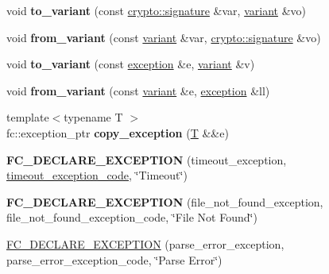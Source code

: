 \begin{DoxyCompactItemize}
\mbox{\label{namespacefc_aa5e2b21d0072d16a3f54eb1074606bb2}} 
void {\bfseries to\+\_\+variant} (const \mbox{\hyperlink{classfc_1_1crypto_1_1signature}{crypto\+::signature}} \&var, \mbox{\hyperlink{classfc_1_1variant}{variant}} \&vo)
\item 
\mbox{\label{namespacefc_a5df83b6ab6fb04781a438ac3ad62970b}} 
void {\bfseries from\+\_\+variant} (const \mbox{\hyperlink{classfc_1_1variant}{variant}} \&var, \mbox{\hyperlink{classfc_1_1crypto_1_1signature}{crypto\+::signature}} \&vo)
\item 
\mbox{\label{namespacefc_a884f9614b8437dc47cb85485135768d9}} 
void {\bfseries to\+\_\+variant} (const \mbox{\hyperlink{classfc_1_1exception}{exception}} \&e, \mbox{\hyperlink{classfc_1_1variant}{variant}} \&v)
\item 
\mbox{\label{namespacefc_a6be167428413d111e9d85be8fe4fd260}} 
void {\bfseries from\+\_\+variant} (const \mbox{\hyperlink{classfc_1_1variant}{variant}} \&e, \mbox{\hyperlink{classfc_1_1exception}{exception}} \&ll)
\item 
\mbox{\label{namespacefc_a1647dced269f496f726a7fe5181b35d6}} 
{\footnotesize template$<$typename T $>$ }\\fc\+::exception\+\_\+ptr {\bfseries copy\+\_\+exception} (\mbox{\hyperlink{struct_t}{T}} \&\&e)
\item 
\mbox{\label{namespacefc_a768347715403dc13ed9b3a3cb2b28643}} 
{\bfseries F\+C\+\_\+\+D\+E\+C\+L\+A\+R\+E\+\_\+\+E\+X\+C\+E\+P\+T\+I\+ON} (timeout\+\_\+exception, \mbox{\hyperlink{namespacefc_ab52b42f18c442a260897c74c66c3d35ca0269f214acef1ad4c7531974bc011893}{timeout\+\_\+exception\+\_\+code}}, \char`\"{}Timeout\char`\"{})
\item 
\mbox{\label{namespacefc_aef7440e7f364356c25f11ed630b12f5b}} 
{\bfseries F\+C\+\_\+\+D\+E\+C\+L\+A\+R\+E\+\_\+\+E\+X\+C\+E\+P\+T\+I\+ON} (file\+\_\+not\+\_\+found\+\_\+exception, file\+\_\+not\+\_\+found\+\_\+exception\+\_\+code, \char`\"{}File Not Found\char`\"{})
\item 
\mbox{\label{namespacefc_ab3bde4c2482b5f385cb18819b9c805ca}} 
\mbox{\hyperlink{namespacefc_ab3bde4c2482b5f385cb18819b9c805ca}{F\+C\+\_\+\+D\+E\+C\+L\+A\+R\+E\+\_\+\+E\+X\+C\+E\+P\+T\+I\+ON}} (parse\+\_\+error\+\_\+exception, parse\+\_\+error\+\_\+exception\+\_\+code, \char`\"{}Parse Error\char`\"{})

\end{DoxyCompactItemize}

